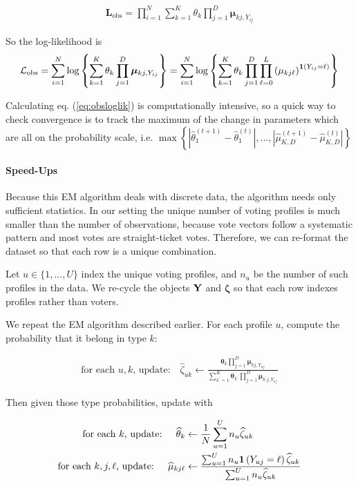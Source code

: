 \documentclass[11pt]{article}
\begin{document}
\begin{align*}
\mathbf{L}_{\text{obs}} = \prod^N_{i=1}\sum^{K}_{k=1}\theta_k \prod^{D}_{j=1}\bm{\mu}_{kj,Y_{ij}}
\end{align*}

So the log-likelihood is
\begin{align}
\mathcal{L}_{\text{obs}} = \sum^{N}_{i=1}\log \left\{\sum^{K}_{k=1}\theta_k \prod^{D}_{j=1}\bm{\mu}_{kj,Y_{ij}}\right\} = \sum^{N}_{i=1}\log \left\{\sum^{K}_{k=1}\theta_k \prod^{D}_{j=1}\prod^{L}_{\ell = 0}\left(\mu_{kj\ell}\right)^{\bm{1}\left(Y_{ij} = \ell\right)}\right\} \label{eq:obsloglik}
\end{align}

Calculating eq. (\ref{eq:obsloglik}) is computationally intensive, so a quick way to check convergence is to track the maximum of the change in parameters which are all on the probability scale, i.e. \(\max\left\{|\widehat\theta^{(t + 1)}_{1} - \widehat\theta^{(t)}_{1}|, ..., |\widehat\mu^{(t + 1)}_{K,D} - \widehat\mu^{(t)}_{K,D}|\right\}\)

\paragraph{Speed-Ups} Because this EM algorithm deals with discrete data, the algorithm needs only sufficient statistics. In our setting the unique number of voting profiles is much smaller than the number of observations, because vote vectors follow a systematic pattern and most votes are straight-ticket votes. Therefore, we can re-format the dataset so that each row is a unique combination.

Let \(u \in \{1, ..., U\}\) index the unique voting profiles, and \(n_{u}\) be the number of such profiles in the data.  We re-cycle the objects \(\mathbf{Y}\) and \(\bm\zeta\) so that each row indexes profiles rather than voters.

We repeat the EM algorithm described earlier. For each profile \(u\), compute the probability that it belong in type \(k\):

\begin{align}
\text{for each \(u, k\), update: }~~~   \widehat\zeta_{uk} \leftarrow \frac{\bm{\theta}_{k}\prod^{D}_{j=1}\bm{\mu}_{kj,Y_{uj}}}
{\sum^{K}_{k^\prime=1}\bm{\theta}_{k^\prime}\prod^{D}_{j=1}\bm{\mu}_{k^\prime j,Y_{uj}}}
\end{align}

Then given those type probabilities, update with

\begin{align}
\text{for each \(k\), update: }~~~   \widehat{\theta}_{k} &\leftarrow \frac{1}{N}\sum^U_{u = 1}n_{u}\widehat{\zeta}_{uk}\\
\text{for each \(k, j, \ell\), update: }~~~   \widehat{\mu}_{kj\ell} &\leftarrow\frac{\sum^U_{u=1}n_{u}\bm{1}\left(Y_{uj} = \ell\right)\widehat{\zeta}_{uk}}{\sum^{U}_{u=1}n_{u}\widehat{\zeta}_{uk}}
\end{align}
\end{document}
